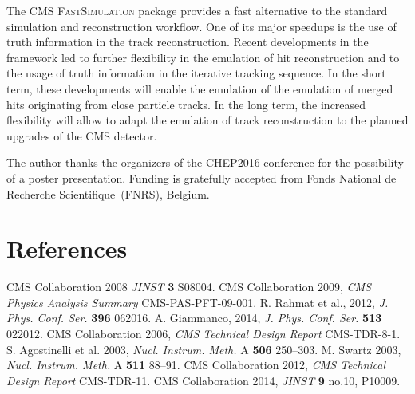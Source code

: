 \documentclass[a4paper]{jpconf}
\begin{document}
The CMS \textsc{FastSimulation} package provides a fast alternative to the standard simulation and reconstruction workflow. One of its major speedups is the use of truth information in the track reconstruction. Recent developments in the framework led to further flexibility in the emulation of hit reconstruction and to the usage of truth information in the iterative tracking sequence. In the short term, these developments will enable the emulation of the emulation of merged hits originating from close particle tracks. In the long term, the increased flexibility will allow to adapt the emulation of track reconstruction to the planned upgrades of the CMS detector.

\ack
The author thanks the organizers of the \textsc{CHEP2016} conference for the possibility of a poster presentation. Funding is gratefully accepted from Fonds National de Recherche Scientifique~(FNRS), Belgium.


\section*{References}

\begin{thebibliography}{99}
 CMS Collaboration 2008 {\it JINST} \textbf{3} S08004.
 CMS Collaboration 2009, {\it CMS Physics Analysis Summary} CMS-PAS-PFT-09-001.
 R. Rahmat et al., 2012, {\it J. Phys. Conf. Ser.} \textbf{396} 062016.
 A. Giammanco, 2014, {\it J. Phys. Conf. Ser.} \textbf{513} 022012.
 CMS Collaboration 2006, {\it CMS Technical Design Report} CMS-TDR-8-1.
 S. Agostinelli et al. 2003, {\it Nucl. Instrum. Meth.} A \textbf{506} 250--303. 
 M. Swartz 2003, {\it Nucl. Instrum. Meth.} A \textbf{511} 88--91.
 CMS Collaboration 2012, {\it CMS Technical Design Report} CMS-TDR-11.
 CMS Collaboration 2014, {\it JINST} \textbf{9} no.10, P10009.

\end{thebibliography}
\end{document}
